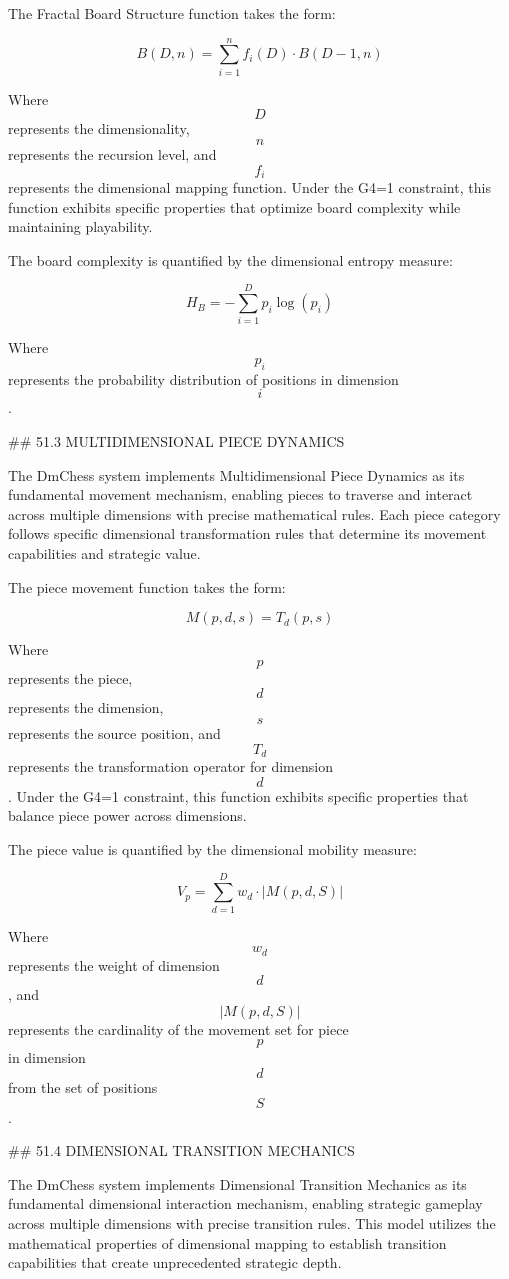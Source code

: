 The Fractal Board Structure function takes the form:

$$ B(D, n) = \sum_{i=1}^{n} f_i(D) \cdot B(D-1, n) $$

Where $$ D $$ represents the dimensionality, $$ n $$ represents the recursion level, and $$ f_i $$ represents the dimensional mapping function. Under the G4=1 constraint, this function exhibits specific properties that optimize board complexity while maintaining playability.

The board complexity is quantified by the dimensional entropy measure:

$$ H_B = -\sum_{i=1}^{D} p_i \log(p_i) $$

Where $$ p_i $$ represents the probability distribution of positions in dimension $$ i $$.

## 51.3 MULTIDIMENSIONAL PIECE DYNAMICS

The DmChess system implements Multidimensional Piece Dynamics as its fundamental movement mechanism, enabling pieces to traverse and interact across multiple dimensions with precise mathematical rules. Each piece category follows specific dimensional transformation rules that determine its movement capabilities and strategic value.

The piece movement function takes the form:

$$ M(p, d, s) = T_d(p, s) $$

Where $$ p $$ represents the piece, $$ d $$ represents the dimension, $$ s $$ represents the source position, and $$ T_d $$ represents the transformation operator for dimension $$ d $$. Under the G4=1 constraint, this function exhibits specific properties that balance piece power across dimensions.

The piece value is quantified by the dimensional mobility measure:

$$ V_p = \sum_{d=1}^{D} w_d \cdot |M(p, d, S)| $$

Where $$ w_d $$ represents the weight of dimension $$ d $$, and $$ |M(p, d, S)| $$ represents the cardinality of the movement set for piece $$ p $$ in dimension $$ d $$ from the set of positions $$ S $$.

## 51.4 DIMENSIONAL TRANSITION MECHANICS

The DmChess system implements Dimensional Transition Mechanics as its fundamental dimensional interaction mechanism, enabling strategic gameplay across multiple dimensions with precise transition rules. This model utilizes the mathematical properties of dimensional mapping to establish transition capabilities that create unprecedented strategic depth.

